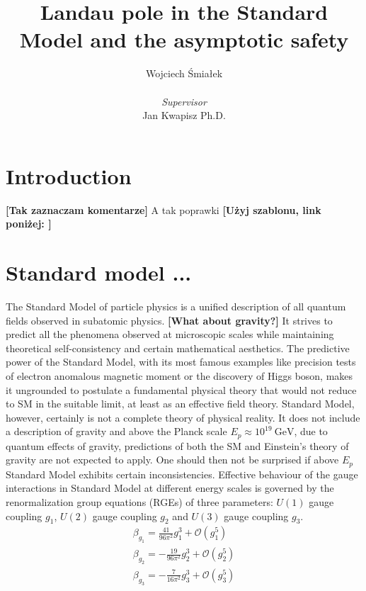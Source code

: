 \documentclass[11pt, a4paper]{article}
\title{\vspace{-2cm}Landau pole in the Standard Model and the asymptotic safety}
\author{{Wojciech Śmiałek}\\
\\
{\textit{Supervisor}} \\
{Jan Kwapisz Ph.D.}}
\date{}
\newcommand{\jhk}[1]{{\color{red}#1}}
\newcommand{\jhkbf}[1]{\textbf{\color{red} [#1]}}
\begin{document}
\maketitle

\section{Introduction}
\jhkbf{Tak zaznaczam komentarze}
\jhk{A tak poprawki}
\jhkbf{Użyj szablonu, link poniżej: }


\section{Standard model ...}
The Standard Model of particle physics is a unified description of all quantum fields observed in subatomic physics.  \jhkbf{What about gravity?}
It strives to predict all the phenomena observed at microscopic scales while maintaining theoretical
self-consistency and certain mathematical aesthetics. The predictive power of the Standard Model, with its most
famous examples like precision tests of electron anomalous magnetic moment or the discovery of Higgs boson,
makes it ungrounded to postulate a fundamental physical theory that would not reduce to SM in the suitable limit, at least
as an effective field theory.
Standard Model, however, certainly is not a complete theory of physical reality. It does not include a description
of gravity and above the Planck scale $E_p \approx 10^{19} \ \text{GeV}$, due to quantum effects of gravity,
predictions of both the SM and Einstein's theory of gravity are not expected to apply.
One should then not be surprised if above $E_p$ Standard Model exhibits certain inconsistencies.
Effective behaviour of the gauge interactions in Standard Model at different energy scales is governed by the renormalization group equations (RGEs) of three parameters: $U(1)$ gauge coupling $g_1$, $U(2)$ gauge coupling $g_2$ and $U(3)$ gauge coupling $g_3$.
\begin{gather}
   \beta_{g_1} = \frac{41}{96\pi^2} g_1^3 + \mathcal{O}(g_1^5) \\%
    \beta_{g_2} = - \frac{19}{96\pi^2} g_2^3  + \mathcal{O}(g_2^5)\\
    \beta_{g_3} = - \frac{7}{16\pi^2} g_3^3 + \mathcal{O}(g_3^5) \\
\end{gather}
\end{document}
